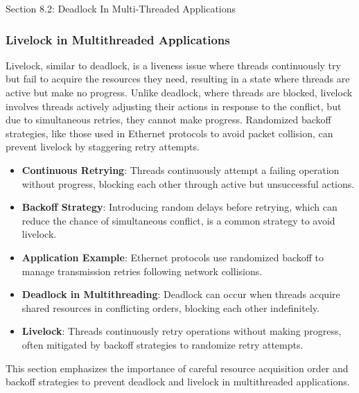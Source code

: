 \begin{notes}{Section 8.2: Deadlock In Multi-Threaded Applications}
\begin{highlight}
    \end{highlight}
    
    \subsubsection*{Livelock in Multithreaded Applications}
    
    Livelock, similar to deadlock, is a liveness issue where threads continuously try but fail to acquire the resources they need, resulting in a state where threads are active but make no progress. 
    Unlike deadlock, where threads are blocked, livelock involves threads actively adjusting their actions in response to the conflict, but due to simultaneous retries, they cannot make progress. Randomized backoff strategies, like those used in Ethernet protocols to avoid packet collision, can prevent livelock by staggering retry attempts.
    
    \begin{highlight}
    
        \begin{itemize}
            \item \textbf{Continuous Retrying}: Threads continuously attempt a failing operation without progress, blocking each other through active but unsuccessful actions.
            \item \textbf{Backoff Strategy}: Introducing random delays before retrying, which can reduce the chance of simultaneous conflict, is a common strategy to avoid livelock.
            \item \textbf{Application Example}: Ethernet protocols use randomized backoff to manage transmission retries following network collisions.
        \end{itemize}
    
    \end{highlight}
    
    \begin{highlight}
    
        \begin{itemize}
            \item \textbf{Deadlock in Multithreading}: Deadlock can occur when threads acquire shared resources in conflicting orders, blocking each other indefinitely.
            \item \textbf{Livelock}: Threads continuously retry operations without making progress, often mitigated by backoff strategies to randomize retry attempts.
        \end{itemize}
    
    This section emphasizes the importance of careful resource acquisition order and backoff strategies to prevent deadlock and livelock in multithreaded applications.
    
    \end{highlight}
\end{notes}

